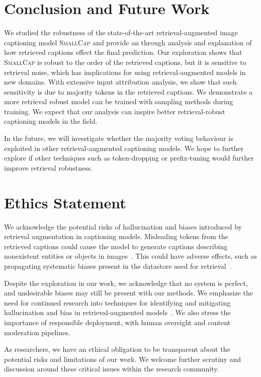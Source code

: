 \section{Conclusion and Future Work}
We studied the robustness of the state-of-the-art retrieval-augmented image captioning model \textsc{SmallCap} and provide an through analysis and explanation of how retrieved captions effect the final prediction. Our exploration shows that \textsc{SmallCap} is robust to the order of the retrieved captions, but it is sensitive to retrieval noise, which has implications for using retrieval-augmented models in new domains. With extensive input attribution analysis, we show that such sensitivity is due to majority tokens in the retrieved captions. We demonstrate a more retrieval robust model can be trained with sampling methods during training. We expect that our analysis can inspire better retrieval-robust captioning models in the field. 

In the future, we will investigate whether the majority voting behaviour is exploited in other retrieval-augmented captioning models. We hope to further explore if other techniques such as token-dropping or prefix-tuning would further improve retrieval robustness.

\section*{Ethics Statement}
We acknowledge the potential risks of hallucination and biases introduced by retrieval augmentation in captioning models. Misleading tokens from the retrieved captions could cause the model to generate captions describing nonexistent entities or objects in images~\citep{liu2024survey, rohrbach-etal-2018-object}. This could have adverse effects, such as propagating systematic biases present in the datastore used for retrieval~\citep{foulds2024ragged}.

Despite the exploration in our work, we acknowledge that no system is perfect, and undesirable biases may still be present with our methods. We emphasize the need for continued research into techniques for identifying and mitigating hallucination and bias in retrieval-augmented models~\citep{foulds2024ragged, deng2024seeing}. We also stress the importance of responsible deployment, with human oversight and content moderation pipelines.

As researchers, we have an ethical obligation to be transparent about the potential risks and limitations of our work. We welcome further scrutiny and discussion around these critical issues within the research community. 

